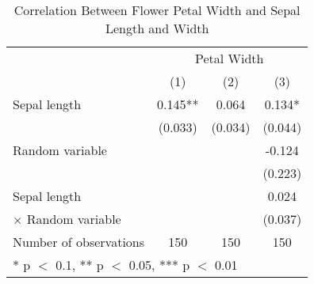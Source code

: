 \begin{table}[H]
\caption{Correlation Between Flower Petal Width and Sepal Length and Width} 
\label{tab:flower_table}
\centering
\begin{tabular}[t]{lccc}
\toprule
& \multicolumn{3}{c}{Petal Width} \\
  & (1) & (2) & (3)\\
\midrule
Sepal length & 0.145** & 0.064 & 0.134*\\
 & (0.033) & (0.034) & (0.044)\\
Random variable &  &  & -0.124\\
 &  &  & (0.223)\\
Sepal length &  &  & 0.024\\
 \quad $\times$ Random variable &  &  & (0.037)\\
\midrule
Number of observations & 150 & 150 & 150\\
\bottomrule
\multicolumn{4}{l}{\rule{0pt}{1em}* p $<$ 0.1, ** p $<$ 0.05, *** p $<$ 0.01}\\
\end{tabular}
\end{table}

